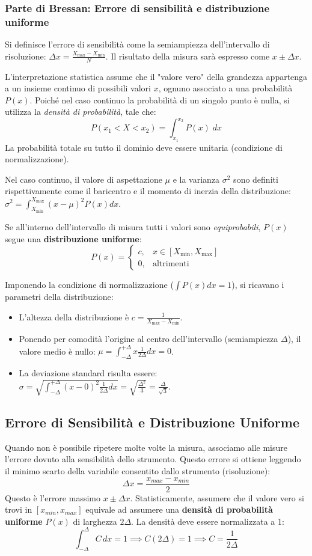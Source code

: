 \documentclass{article}
\theoremstyle{remark}
\newcommand{\ripasso}[1]{
    \subsubsection{\texorpdfstring{\color{red}Parte di Bressan: #1}{Parte di Bressan: #1}}
}
\begin{document}
\ripasso{Errore di sensibilità e distribuzione uniforme}

Si definisce l'errore di sensibilità come la semiampiezza dell'intervallo di risoluzione: $\displaystyle \Delta x = \frac{X_{\max} - X_{\min}}{N}$. Il risultato della misura sarà espresso come $x \pm \Delta x$.

L'interpretazione statistica assume che il "valore vero" della grandezza appartenga a un insieme continuo di possibili valori $x$, ognuno associato a una probabilità $P(x)$. Poiché nel caso continuo la probabilità di un singolo punto è nulla, si utilizza la \textit{densità di probabilità}, tale che:
\[
P(x_1 < X < x_2) = \int_{x_1}^{x_2} P(x) \; dx
\]
La probabilità totale su tutto il dominio deve essere unitaria (condizione di normalizzazione).

Nel caso continuo, il valore di aspettazione $\mu$ e la varianza $\sigma^2$ sono definiti rispettivamente come il baricentro e il momento di inerzia della distribuzione: $\displaystyle \sigma^2 = \int_{X_{\min}}^{X_{\max}}(x - \mu)^2 P(x) dx$.

Se all'interno dell'intervallo di misura tutti i valori sono \textit{equiprobabili}, $P(x)$ segue una \textbf{distribuzione uniforme}:
\[
P(x)=
\begin{cases}
    c , & x \in [X_{\min}, X_{\max}] \\
    0 , & \text{altrimenti}
\end{cases}
\]

Imponendo la condizione di normalizzazione ($\int P(x)dx = 1$), si ricavano i parametri della distribuzione:
\begin{itemize}
    \item L'altezza della distribuzione è $\displaystyle c = \frac{1}{X_{\max} - X_{\min}}$.
    \item Ponendo per comodità l'origine al centro dell'intervallo (semiampiezza $\Delta$), il valore medio è nullo:
    $\displaystyle \mu = \int_{-\Delta}^{+\Delta} x \frac{1}{2 \Delta } dx = 0$.
    \item La deviazione standard risulta essere:
    $\displaystyle \sigma = \sqrt{\int_{-\Delta}^{+\Delta} (x - 0)^2 \frac{1}{2 \Delta } dx} = \sqrt{\frac{\Delta^2}{3}} = \frac{\Delta}{\sqrt{3}}$.
\end{itemize}

\subsection{Errore di Sensibilità e Distribuzione Uniforme}
Quando non è possibile ripetere molte volte la misura, associamo alle misure l'errore dovuto alla sensibilità dello strumento. Questo errore si ottiene leggendo il minimo scarto della variabile consentito dallo strumento (risoluzione):
\[ \Delta x = \frac{x_{max} - x_{min}}{2} \]
Questo è l'errore massimo $x \pm \Delta x$. Statisticamente, assumere che il valore vero si trovi in $[x_{min}, x_{max}]$ equivale ad assumere una \textbf{densità di probabilità uniforme} $P(x)$ di larghezza $2\Delta$.
La densità deve essere normalizzata a 1:
\[ \int_{-\Delta}^{\Delta} C \, dx = 1 \implies C(2\Delta) = 1 \implies C = \frac{1}{2\Delta} \]
\end{document}
